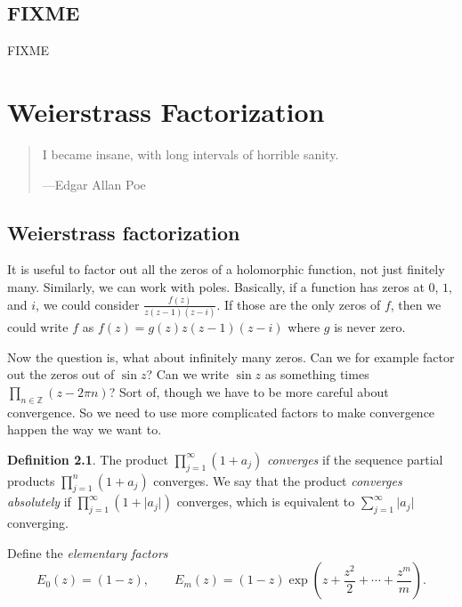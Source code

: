 \documentclass[12pt,openany]{book}
\newcommand{\sabs}[1]{\lvert {#1} \rvert}
\newcommand{\Z}{{\mathbb{Z}}}
\newcommand{\myindex}[1]{#1\index{#1}}
\theoremstyle{plain}
\theoremstyle{remark}
\theoremstyle{definition}
\newtheorem{defn}[thm]{Definition}
\newenvironment{myquote}{%
    \begin{quote}%
    \begingroup\itshape
}{%
    \endgroup%
    \end{quote}
}
\theoremstyle{exercise}
\theoremstyle{example}
\begin{document}
\section{FIXME}
\label{sec:ratFIXME}

FIXME


\chapter{Weierstrass Factorization} \label{ch:weier}

\begin{myquote}
I became insane, with long intervals of horrible sanity.

---Edgar Allan Poe
\end{myquote}


\section{Weierstrass factorization}
\label{sec:weier}

It is useful to factor out all the zeros of a holomorphic function,
not just finitely many.  Similarly, we can work with poles.  Basically, if a
function has zeros at $0$, $1$, and $i$, we could consider
$\frac{f(z)}{z(z-1)(z-i)}$.  If those are the only zeros of $f$, then we
could write $f$ as
$f(z) = g(z) z(z-1)(z-i)$ where $g$ is never zero.

Now the question is, what about infinitely many
zeros.  Can we for example factor out the zeros out of $\sin z$?  Can we
write $\sin z$ as something times $\prod_{n \in \Z} (z-2\pi n)$?  Sort of,
though we have to be more careful about convergence.  So we need to use
more complicated factors to make convergence happen the way we want to.

\begin{defn}
The product
$\prod_{j=1}^\infty (1+a_j)$
\emph{converges} if the sequence partial products
$\prod_{j=1}^n (1+a_j)$ converges.  We say that the product
\emph{converges absolutely}
if $\prod_{j=1}^\infty (1+\sabs{a_j})$
converges, which is equivalent to $\sum_{j=1}^\infty \sabs{a_j}$ converging.

Define the \emph{\myindex{elementary factors}}
\begin{equation*}
E_0(z) = (1-z), \qquad
E_m(z) = (1-z) \exp\left( z +\frac{z^2}{2} + \cdots + \frac{z^m}{m} \right)
.
\end{equation*}
\end{defn}
\end{document}
